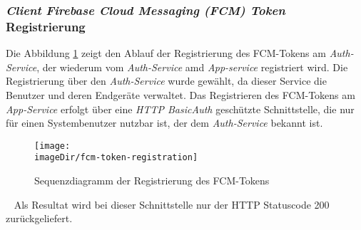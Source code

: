 \documentclass[]{article}
\newcommand{\imageDir}{../../images}
\begin{document}
{{{{\subsubsection{\emph{Client} \emph{Firebase Cloud Messaging (FCM) Token} Registrierung}
Die Abbildung \ref{fig:image-sequence-fcm-token-registration} zeigt den Ablauf der Registrierung des FCM-Tokens am \emph{Auth-Service}, der wiederum vom \emph{Auth-Service} amd \emph{App-service} registriert wird. Die Registrierung über den \emph{Auth-Service} wurde gewählt, da dieser Service die Benutzer und deren Endgeräte verwaltet. Das Registrieren des FCM-Tokens am \emph{App-Service} erfolgt über eine \emph{HTTP BasicAuth} geschützte Schnittstelle, die nur für einen Systembenutzer nutzbar ist, der dem \emph{Auth-Service} bekannt ist. 
\newpage
\begin{figure}[h]
	\centering
	\texttt{[image: \\imageDir/fcm-token-registration]}
	\caption{Sequenzdiagramm der Registrierung des FCM-Tokens}
	\label{fig:image-sequence-fcm-token-registration}
\end{figure}
\ \newline
Als Resultat wird bei dieser Schnittstelle nur der HTTP Statuscode 200 zurückgeliefert.

}}}}
\end{document}
